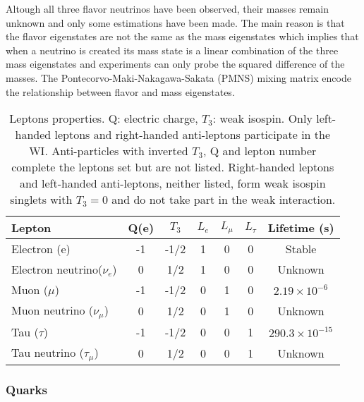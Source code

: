 \noindent Altough all three flavor neutrinos have been observed, their masses remain unknown and only some estimations have been made\cite{nu_mass}. The main reason is that the flavor eigenstates are not the same as the mass eigenstates which implies that when a neutrino is created its mass state is a linear combination of the three mass eigenstates and experiments can only probe the squared difference of the masses. The Pontecorvo-Maki-Nakagawa-Sakata (PMNS) mixing matrix encode the relationship between flavor and mass eigenstates.
\begin{center}
\begin{table}[h]
\centering
\footnotesize
\begin{tabular}{lcccccc} \hline
Lepton                      & Q(e) & $T_3$&$L_e$ & $L_\mu$ & $L_\tau$ & Lifetime (s)                \\ \hline
Electron (e)                & -1   & -1/2 & 1    & 0       & 0        & Stable                      \\ %
Electron neutrino($\nu_e$)  & 0    &  1/2 & 1    & 0       & 0        & Unknown                     \\ %
Muon ($\mu$)                & -1   & -1/2 & 0    & 1       & 0        & $2.19\times10^{-6}$\\ %
Muon neutrino ($\nu_\mu$)   & 0    &  1/2 & 0    & 1       & 0        & Unknown                     \\ %
Tau ($\tau$)                & -1   & -1/2 & 0    & 0       & 1        & $290.3\times10^{-15}$    \\ %
Tau neutrino ($\tau_\mu$)   & 0    &  1/2 & 0    & 0       & 1        & Unknown                     \\ \hline
\end{tabular}
\caption[Leptons properties.]{Leptons properties\cite{pdg}. Q: electric charge, $T_3$: weak isospin. Only left-handed leptons and right-handed anti-leptons participate in the WI. Anti-particles with inverted $T_3$, Q and lepton number complete the leptons set but are not listed. Right-handed leptons and left-handed anti-leptons, neither listed, form weak isospin singlets with $T_3=0$ and do not take part in the weak interaction.}\label{leptons}
\end{table}
\end{center}

\subsubsection{Quarks}

